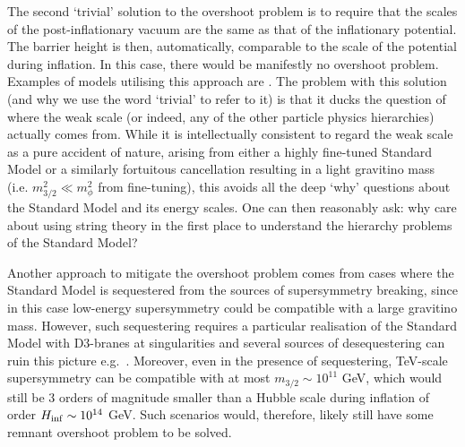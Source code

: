 The second `trivial' solution to the overshoot problem is to require that the scales of the post-inflationary vacuum are the same as that of the inflationary potential. The barrier height is then, automatically, comparable to the scale of the potential during inflation. In this case, there would be manifestly no overshoot problem. Examples of models utilising this approach are \cite{0411011, 0611183, 11124488}. The problem with this solution (and why we use the word `trivial' to refer to it) is that it ducks the question of where the weak scale (or indeed, any of the other particle physics hierarchies) actually comes from. While it is intellectually consistent to regard the weak scale as a pure accident of nature, arising from either a highly fine-tuned Standard Model or a similarly fortuitous cancellation resulting in a light gravitino mass (i.e. $m_{3/2}^2 \ll m_\phi^2$ from fine-tuning), this avoids all the deep `why' questions about the Standard Model and its energy scales. One can then reasonably  ask: why care about using string theory in the first place to understand the hierarchy problems of the Standard Model?

Another approach to mitigate the overshoot problem comes from cases where the Standard Model is 
sequestered from the sources of supersymmetry breaking, since in this case low-energy supersymmetry could be compatible 
with a large gravitino mass. However, such sequestering requires a particular realisation of the Standard Model with D3-branes at singularities and several sources of desequestering can ruin this picture e.g.~\cite{Conlon:2010ji, Berg:2012aq}. Moreover, even in the presence of sequestering, TeV-scale supersymmetry can be compatible with at most $m_{3/2}\sim 10^{11}$ GeV, which would still be 3 orders of magnitude smaller than a Hubble scale during inflation of order $H_{\rm inf}\sim 10^{14}$ GeV. Such scenarios would, therefore, likely still have some remnant overshoot problem to be solved.



